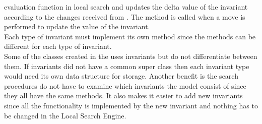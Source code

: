 evaluation function in local search and updates the delta value of the invariant according to the changes 
received from . The method  is called when a move is performed to update the 
value of the invariant. \\ 
Each type of invariant must implement its own method since the methods can be different for each type of invariant. \\ 
Some of the classes created in the  uses invariants but do not differentiate between them. 
If invariants did not have a common super class then each invariant type would need its own data structure for 
storage. Another benefit is the search procedures do not have to examine which invariants the model consist of since 
they 
all have the same methods. It also makes it easier to add new invariants since all the functionality is implemented by 
the new invariant and nothing has to be changed in the Local Search Engine. \\ 
 

